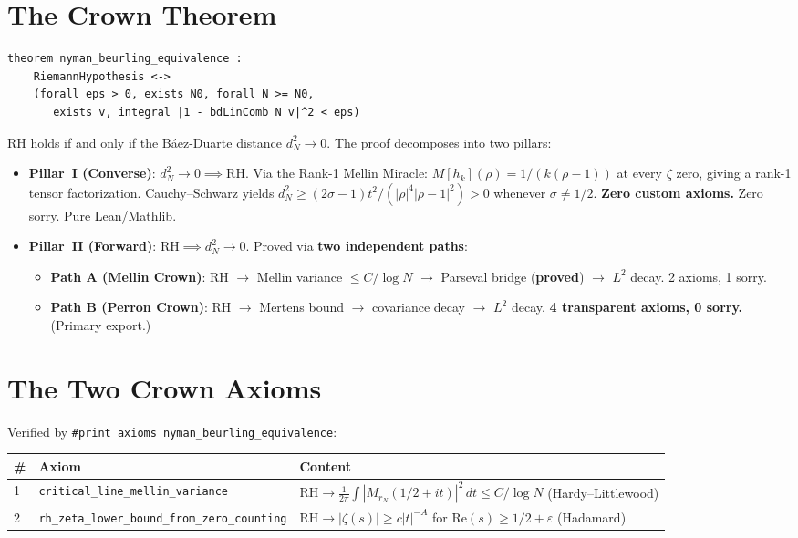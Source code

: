 \documentclass[12pt,a4paper]{article}
\begin{document}
\section{The Crown Theorem}

\begin{verbatim}
theorem nyman_beurling_equivalence :
    RiemannHypothesis <->
    (forall eps > 0, exists N0, forall N >= N0,
       exists v, integral |1 - bdLinComb N v|^2 < eps)
\end{verbatim}

\noindent RH holds if and only if the B\'aez-Duarte distance
$d_N^2 \to 0$. The proof decomposes into two pillars:

\begin{itemize}
\item \textbf{Pillar~I (Converse)}: $d_N^2 \to 0 \implies \mathrm{RH}$.
  Via the Rank-1 Mellin Miracle: $M[h_k](\rho) = 1/(k(\rho-1))$ at
  every $\zeta$ zero, giving a rank-1 tensor factorization.
  Cauchy--Schwarz yields $d_N^2 \ge (2\sigma - 1)t^2/(|\rho|^4|\rho-1|^2)> 0$
  whenever $\sigma \ne 1/2$.
  \textbf{Zero custom axioms.} Zero sorry. Pure Lean/Mathlib.

\item \textbf{Pillar~II (Forward)}: $\mathrm{RH} \implies d_N^2 \to 0$.
  Proved via \textbf{two independent paths}:
  \begin{itemize}
    \item \textbf{Path A (Mellin Crown)}: RH $\to$ Mellin variance $\le C/\log N$
      $\to$ Parseval bridge (\textbf{proved}) $\to$ $L^2$ decay.
      2 axioms, 1 sorry.
    \item \textbf{Path B (Perron Crown)}: RH $\to$ Mertens bound
      $\to$ covariance decay $\to$ $L^2$ decay.
      \textbf{4 transparent axioms, 0 sorry.} (Primary export.)
  \end{itemize}
\end{itemize}

\section{The Two Crown Axioms}

Verified by \texttt{\#print axioms nyman\_beurling\_equivalence}:

\begin{table}[h]
\centering
\begin{tabular}{@{}llp{5.5cm}@{}}
\toprule
\textbf{\#} & \textbf{Axiom} & \textbf{Content} \\
\midrule
1 & \texttt{critical\_line\_mellin\_variance} & $\mathrm{RH} \to \frac{1}{2\pi}\int |M_{r_N}(1/2+it)|^2\,dt \le C/\log N$ (Hardy--Littlewood) \\
2 & \texttt{rh\_zeta\_lower\_bound\_from\_zero\_counting} & $\mathrm{RH} \to |\zeta(s)| \ge c|t|^{-A}$ for $\mathrm{Re}(s) \ge 1/2+\varepsilon$ (Hadamard) \\
\bottomrule
\end{tabular}
\end{table}
\end{document}
